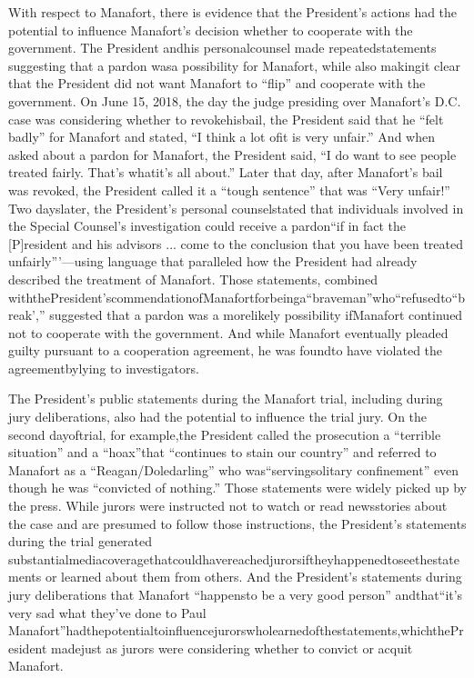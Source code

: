 With respect to Manafort, there is evidence that the President’s actions had the potential to influence Manafort’s decision whether to cooperate with the government. The President andhis personalcounsel made repeatedstatements suggesting that a pardon wasa possibility for Manafort, while also makingit clear that the President did not want Manafort to “flip” and cooperate with the government. On June 15, 2018, the day the judge presiding over Manafort’s D.C. case was considering whether to revokehisbail, the President said that he “felt badly” for Manafort and stated, “I think a lot ofit is very unfair.” And when asked about a pardon for Manafort, the President said, “I do want to see people treated fairly. That’s whatit’s all about.” Later that day, after Manafort’s bail was revoked, the President called it a “tough sentence” that was “Very unfair!” Two dayslater, the President’s personal counselstated that individuals involved in the Special Counsel’s investigation could receive a pardon“if in fact the [P]resident and his advisors ... come to the conclusion that you have been treated unfairly”’—using language that paralleled how the President had already described the treatment of Manafort. Those statements, combined withthePresident’scommendationofManafortforbeinga“braveman”who“refusedto“break’,” suggested that a pardon was a morelikely possibility ifManafort continued not to cooperate with the government. And while Manafort eventually pleaded guilty pursuant to a cooperation agreement, he was foundto have violated the agreementbylying to investigators.

The President’s public statements during the Manafort trial, including during jury deliberations, also had the potential to influence the trial jury. On the second dayoftrial, for example,the President called the prosecution a “terrible situation” and a “hoax”that “continues to stain our country” and referred to Manafort as a “Reagan/Doledarling” who was“servingsolitary confinement” even though he was “convicted of nothing.” Those statements were widely picked up by the press. While jurors were instructed not to watch or read newsstories about the case and are presumed to follow those instructions, the President’s statements during the trial generated substantialmediacoveragethatcouldhavereachedjurorsiftheyhappenedtoseethestatements or learned about them from others. And the President’s statements during jury deliberations that Manafort “happensto be a very good person” andthat“it’s very sad what they’ve done to Paul Manafort”hadthepotentialtoinfluencejurorswholearnedofthestatements,whichthePresident madejust as jurors were considering whether to convict or acquit Manafort.

